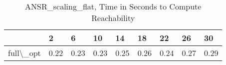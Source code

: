 \begin{table}
\centering
\caption{ANSR\_scaling\_flat, Time in Seconds to Compute Reachability}
\label{ANSR_scaling_flat_states_time}
\begin{tabular}{lllllllll}
\toprule
{} &     2 &     6 &    10 &    14 &    18 &    22 &    26 &    30 \\
\midrule
full\textbackslash \_opt &  0.22 &  0.23 &  0.23 &  0.25 &  0.26 &  0.24 &  0.27 &  0.29 \\
\bottomrule
\end{tabular}
\end{table}
